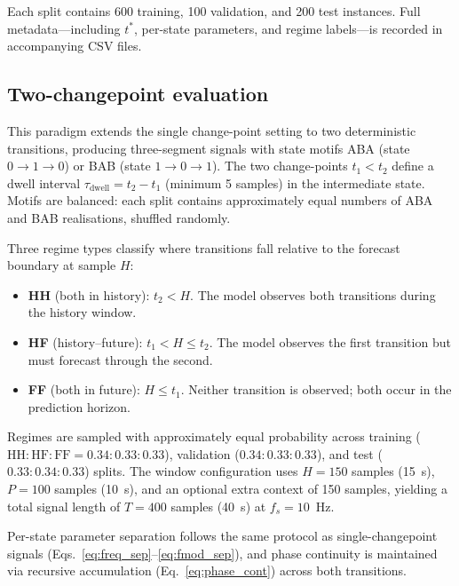 \documentclass[11pt]{article}
\begin{document}
Each split contains 600 training, 100 validation, and 200 test instances. Full metadata---including $t^*$, per-state parameters, and regime labels---is recorded in accompanying CSV files.

\subsection{Two-changepoint evaluation}
\label{sec:two_cp}

This paradigm extends the single change-point setting to two deterministic transitions, producing three-segment signals with state motifs ABA (state $0 \to 1 \to 0$) or BAB (state $1 \to 0 \to 1$). The two change-points $t_1 < t_2$ define a dwell interval $\tau_{\mathrm{dwell}} = t_2 - t_1$ (minimum 5 samples) in the intermediate state. Motifs are balanced: each split contains approximately equal numbers of ABA and BAB realisations, shuffled randomly.

Three regime types classify where transitions fall relative to the forecast boundary at sample $H$:

\begin{itemize}
    \item \textbf{HH} (both in history): $t_2 < H$. The model observes both transitions during the history window.
    \item \textbf{HF} (history--future): $t_1 < H \leq t_2$. The model observes the first transition but must forecast through the second.
    \item \textbf{FF} (both in future): $H \leq t_1$. Neither transition is observed; both occur in the prediction horizon.
\end{itemize}

Regimes are sampled with approximately equal probability across training ($\mathrm{HH}\!:\!\mathrm{HF}\!:\!\mathrm{FF} = 0.34\!:\!0.33\!:\!0.33$), validation ($0.34\!:\!0.33\!:\!0.33$), and test ($0.33\!:\!0.34\!:\!0.33$) splits. The window configuration uses $H = 150$ samples (15~s), $P = 100$ samples (10~s), and an optional extra context of 150 samples, yielding a total signal length of $T = 400$ samples (40~s) at $f_s = 10$~Hz.

Per-state parameter separation follows the same protocol as single-changepoint signals (Eqs.~\eqref{eq:freq_sep}--\eqref{eq:fmod_sep}), and phase continuity is maintained via recursive accumulation (Eq.~\eqref{eq:phase_cont}) across both transitions.
\end{document}
